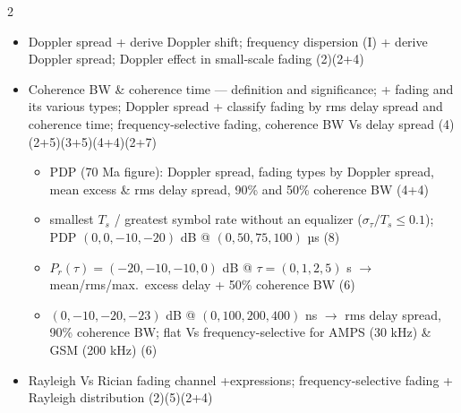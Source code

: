\documentclass[10pt]{article}
\begin{document}
\begin{multicols}{2}
\begin{itemize}
\begin{itemize}
      \item parameters of the mobile multipath channel \hfill (7)
    \end{itemize}
  \item Doppler spread + derive Doppler shift; frequency dispersion (I) + derive Doppler spread; Doppler effect in small-scale fading \hfill (2)(2+4)
  \item Coherence BW \& coherence time --- definition and significance; + fading and its various types; Doppler spread + classify fading by rms delay spread and coherence time; frequency-selective fading, coherence BW Vs delay spread \hfill (4)(2+5)(3+5)(4+4)(2+7)
    \begin{itemize}
      \item PDP (70 Ma figure): Doppler spread, fading types by Doppler spread, mean excess \& rms delay spread, 90\% and 50\% coherence BW \hfill (4+4)
      \item smallest $T_s$ / greatest symbol rate without an equalizer ($\sigma_\tau/T_s{\le}0.1$); PDP $(0,0,-10,-20)$ dB @ $(0,50,75,100)$ µs \hfill (8)
      \item $P_r(\tau){=}(-20,-10,-10,0)$ dB @ $\tau{=}(0,1,2,5)$ s $\rightarrow$ mean/rms/max.\ excess delay + 50\% coherence BW \hfill (6)
      \item $(0,-10,-20,-23)$ dB @ $(0,100,200,400)$ ns $\rightarrow$ rms delay spread, 90\% coherence BW; flat Vs frequency-selective for AMPS (30 kHz) \& GSM (200 kHz) \hfill (6)
    \end{itemize}
  \item Rayleigh Vs Rician fading channel +expressions; frequency-selective fading + Rayleigh distribution \hfill (2)(5)(2+4)
\end{itemize}


\end{multicols}
\end{document}
